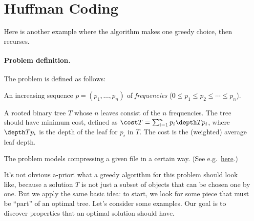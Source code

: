 

\section{Huffman Coding}\label{greedy: sec: huffman coding}

Here is another example where the algorithm makes one greedy choice, then recurses.

\paragraph{Problem definition.}
The  problem is defined as follows:

\begin{mylist}
\item[\bf input:]
  An increasing sequence $p=(p_1, \ldots, p_n)$ of \emph{frequencies}
  ($0\le p_1 \le p_2 \le \cdots \le p_n$).

\item[\bf output:]
  A rooted binary tree $T$ whose $n$ leaves consist of the $n$ frequencies.
  The tree should have minimum cost, defined as
  \(\cost T = \sum_{i=1}^n p_i \depth T {p_i}\),
  where $\depth T {p_i}$ is the depth of the leaf for $p_i$ in $T$.
  The cost is the (weighted) average leaf depth.
\end{mylist}

The problem models compressing a given file in a certain way.
(See e.g.~\href{https://en.wikipedia.org/wiki/Huffman_coding}{here}.)


It's not obvious a-priori what a greedy algorithm for this problem should look like,
because a solution $T$ is not just a subset of objects that can be chosen one by one.
But we apply the same basic idea:
to start, we look for some piece that must be ``part'' of an optimal tree.
Let's consider some examples.
Our goal is to discover properties that an optimal solution should have.

